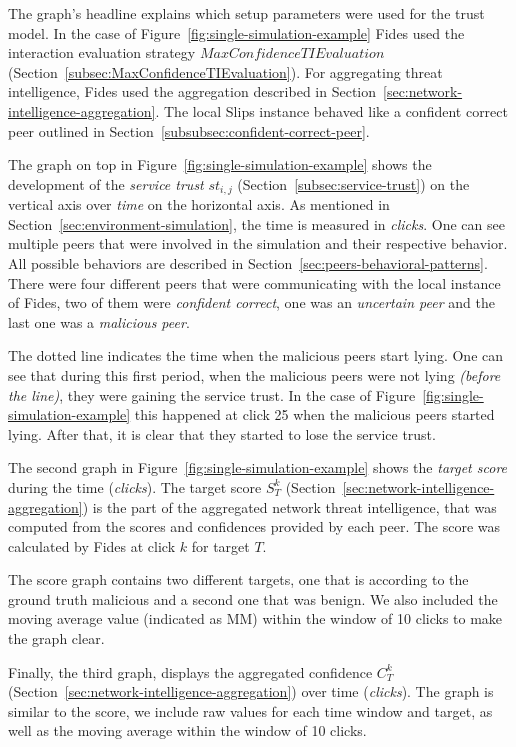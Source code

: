 The graph's headline explains which setup parameters were used for the trust model. In the case of Figure~\ref{fig:single-simulation-example} Fides used the interaction evaluation strategy $MaxConfidenceTIEvaluation$ (Section~\ref{subsec:MaxConfidenceTIEvaluation}).
For aggregating threat intelligence, Fides used the aggregation described in Section~\ref{sec:network-intelligence-aggregation}.
The local Slips instance behaved like a confident correct peer outlined in Section~\ref{subsubsec:confident-correct-peer}.

The graph on top in Figure~\ref{fig:single-simulation-example} shows the development of the \textit{service trust} $st_{i, j}$ (Section~\ref{subsec:service-trust}) on the vertical axis over \textit{time} on the horizontal axis. As mentioned in Section~\ref{sec:environment-simulation}, the time is measured in \textit{clicks}.
One can see multiple peers that were involved in the simulation and their respective behavior. All possible behaviors are described in Section~\ref{sec:peers-behavioral-patterns}.
There were four different peers that were communicating with the local instance of Fides, two of them were \textit{confident correct}, one was an \textit{uncertain peer} and the last one was a \textit{malicious peer}.

The dotted line indicates the time when the malicious peers start lying.
One can see that during this first period, when the malicious peers were not lying \textit{(before the line)}, they were gaining the service trust.
In the case of Figure~\ref{fig:single-simulation-example} this happened at click 25 when the malicious peers started lying.
After that, it is clear that they started to lose the service trust.

The second graph in Figure~\ref{fig:single-simulation-example} shows the \textit{target score} during the time (\textit{clicks}).
The target score $S^{k}_{T}$ (Section~\ref{sec:network-intelligence-aggregation}) is the part of the aggregated network threat intelligence, that was computed from the scores and confidences provided by each peer.
The score was calculated by Fides at click $k$ for target $T$.

The score graph contains two different targets, one that is according to the ground truth malicious and a second one that was benign.
We also included the moving average value (indicated as MM) within the window of 10 clicks to make the graph clear.

Finally, the third graph, displays the aggregated confidence $C^{k}_{T}$ (Section~\ref{sec:network-intelligence-aggregation}) over time (\textit{clicks}).
The graph is similar to the score, we include raw values for each time window and target, as well as the moving average within the window of 10 clicks.

